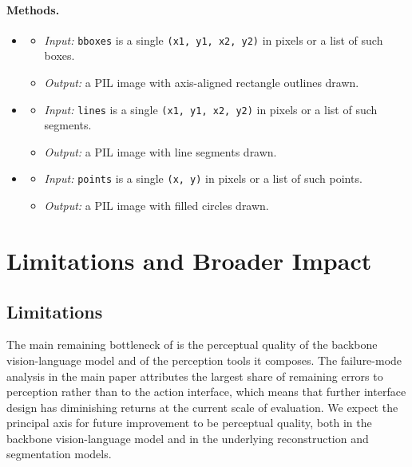 \paragraph{Methods.}
\begin{itemize}[leftmargin=1.5em]
\item {}
  \begin{itemize}
  \item \emph{Input:} \texttt{bboxes} is a single \texttt{(x1, y1, x2, y2)} in pixels or a list of such boxes.
  \item \emph{Output:} a PIL image with axis-aligned rectangle outlines drawn.
  \end{itemize}
\item {}
  \begin{itemize}
  \item \emph{Input:} \texttt{lines} is a single \texttt{(x1, y1, x2, y2)} in pixels or a list of such segments.
  \item \emph{Output:} a PIL image with line segments drawn.
  \end{itemize}
\item {}
  \begin{itemize}
  \item \emph{Input:} \texttt{points} is a single \texttt{(x, y)} in pixels or a list of such points.
  \item \emph{Output:} a PIL image with filled circles drawn.
  \end{itemize}
\end{itemize}


\section{Limitations and Broader Impact}
\label{app:limitations}

\subsection{Limitations}
\label{app:limitations_sub}
The main remaining bottleneck of \ours{} is the perceptual quality of the backbone vision-language model and of the perception tools it composes. The failure-mode analysis in the main paper attributes the largest share of remaining errors to perception rather than to the action interface, which means that further interface design has diminishing returns at the current scale of evaluation. We expect the principal axis for future improvement to be perceptual quality, both in the backbone vision-language model and in the underlying reconstruction and segmentation models.


